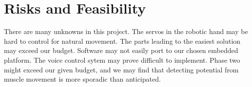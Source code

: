 \documentclass[twoside]{article}
\begin{document}
\section{Risks and Feasibility}
There are many unknowns in this project. The servos in the robotic hand may be hard to control for natural movement. The parts leading to the easiest solution may exceed our budget. Software may not easily port to our chosen embedded platform. The voice control sytem may prove difficult to implement. Phase two might exceed our given budget, and we may find that detecting potential from muscle movement is more sporadic than anticipated.

\end{document}
